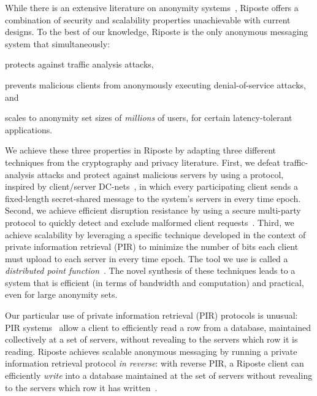 \documentclass[10pt,twocolumn]{article}
\newcommand{\name}{Riposte\xspace}
\newcommand{\Name}{Riposte\xspace}
\begin{document}
While there is an extensive literature on anonymity 
systems~\cite{danezis2008survey,edman2009anonymity},
\name offers a combination of 
security and scalability properties unachievable with
current designs.
To the best of our knowledge, \name is the only anonymous
messaging system that simultaneously:
\begin{compactenum}
\item protects against traffic analysis attacks,
\item prevents malicious clients from anonymously executing 
      denial-of-service attacks, and 
\item scales to anonymity set sizes of 
      {\em millions} of users,
      for certain latency-tolerant applications.
\end{compactenum}
We achieve these three properties in \name 
by adapting three different techniques from the 
cryptography and privacy literature.
First, we defeat traffic-analysis attacks 
and protect against malicious servers by 
using a protocol, inspired by client/server 
DC-nets~\cite{chaum1988dining,wolinsky2012dissent},
in which every participating client sends a fixed-length
secret-shared message to the system's servers in every time epoch.
Second, we achieve efficient disruption resistance
by using a secure multi-party protocol 
to quickly detect and exclude malformed 
client requests~\cite{fagin1996comparing,goldreich1987play,yao1982protocols}.
Third, we achieve scalability
by leveraging a specific technique developed in the context of private information retrieval (PIR) to 
minimize the number of bits each client must upload to
each server in every time epoch.  The tool we use is called
a {\em distributed point function}~\cite{chor1997computationally,gilboa2014distributed}.
The novel synthesis of these techniques leads to a
system that is efficient (in terms of bandwidth and 
computation) and practical, even for large anonymity sets.

Our particular use 
of private information retrieval (PIR) protocols is unusual:
PIR systems~\cite{chor1998private}  allow a client to efficiently read a row from a database,
maintained collectively at a set of servers, without
revealing to the servers which row it is reading.
\Name achieves scalable anonymous messaging by running
a private information retrieval protocol {\em in reverse}:
with reverse PIR, a \name client can efficiently {\em write} into a database
maintained at the set of servers without revealing to 
the servers which row it has written~\cite{ostrovsky1997private}.
\end{document}
